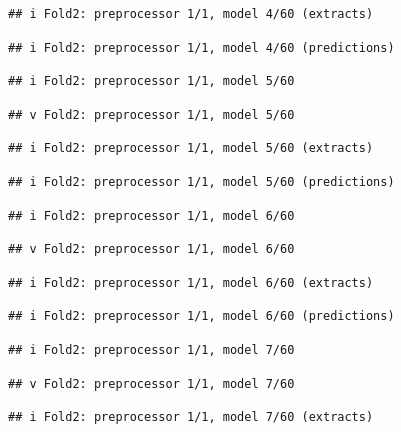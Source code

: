 \documentclass[
]{article}
\begin{document}
\begin{verbatim}
## i Fold2: preprocessor 1/1, model 4/60 (extracts)
\end{verbatim}

\begin{verbatim}
## i Fold2: preprocessor 1/1, model 4/60 (predictions)
\end{verbatim}

\begin{verbatim}
## i Fold2: preprocessor 1/1, model 5/60
\end{verbatim}

\begin{verbatim}
## v Fold2: preprocessor 1/1, model 5/60
\end{verbatim}

\begin{verbatim}
## i Fold2: preprocessor 1/1, model 5/60 (extracts)
\end{verbatim}

\begin{verbatim}
## i Fold2: preprocessor 1/1, model 5/60 (predictions)
\end{verbatim}

\begin{verbatim}
## i Fold2: preprocessor 1/1, model 6/60
\end{verbatim}

\begin{verbatim}
## v Fold2: preprocessor 1/1, model 6/60
\end{verbatim}

\begin{verbatim}
## i Fold2: preprocessor 1/1, model 6/60 (extracts)
\end{verbatim}

\begin{verbatim}
## i Fold2: preprocessor 1/1, model 6/60 (predictions)
\end{verbatim}

\begin{verbatim}
## i Fold2: preprocessor 1/1, model 7/60
\end{verbatim}

\begin{verbatim}
## v Fold2: preprocessor 1/1, model 7/60
\end{verbatim}

\begin{verbatim}
## i Fold2: preprocessor 1/1, model 7/60 (extracts)
\end{verbatim}
\end{document}
